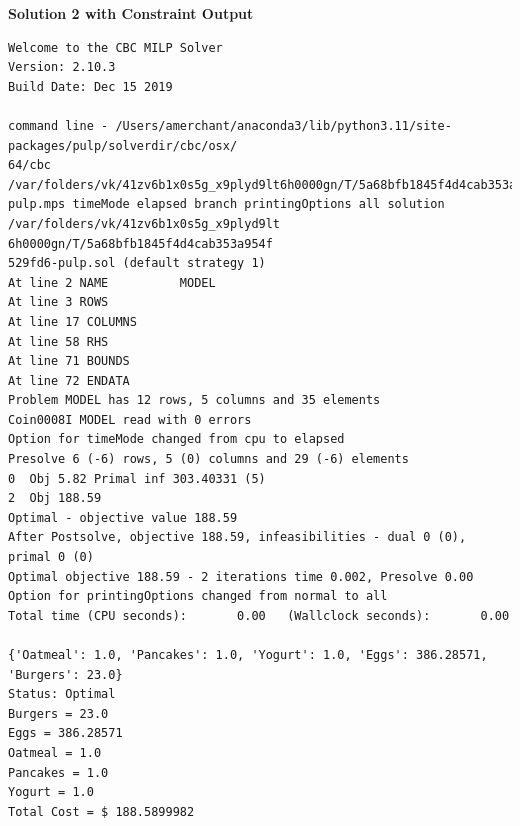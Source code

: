 \documentclass{article}
\begin{document}
\textbf{Solution 2 with Constraint Output}
\label{Solution2 Output}
\begin{lstlisting}[basicstyle=\small]
Welcome to the CBC MILP Solver 
Version: 2.10.3 
Build Date: Dec 15 2019 

command line - /Users/amerchant/anaconda3/lib/python3.11/site-packages/pulp/solverdir/cbc/osx/
64/cbc /var/folders/vk/41zv6b1x0s5g_x9plyd9lt6h0000gn/T/5a68bfb1845f4d4cab353a954f529fd6-
pulp.mps timeMode elapsed branch printingOptions all solution /var/folders/vk/41zv6b1x0s5g_x9plyd9lt
6h0000gn/T/5a68bfb1845f4d4cab353a954f
529fd6-pulp.sol (default strategy 1)
At line 2 NAME          MODEL
At line 3 ROWS
At line 17 COLUMNS
At line 58 RHS
At line 71 BOUNDS
At line 72 ENDATA
Problem MODEL has 12 rows, 5 columns and 35 elements
Coin0008I MODEL read with 0 errors
Option for timeMode changed from cpu to elapsed
Presolve 6 (-6) rows, 5 (0) columns and 29 (-6) elements
0  Obj 5.82 Primal inf 303.40331 (5)
2  Obj 188.59
Optimal - objective value 188.59
After Postsolve, objective 188.59, infeasibilities - dual 0 (0), primal 0 (0)
Optimal objective 188.59 - 2 iterations time 0.002, Presolve 0.00
Option for printingOptions changed from normal to all
Total time (CPU seconds):       0.00   (Wallclock seconds):       0.00

{'Oatmeal': 1.0, 'Pancakes': 1.0, 'Yogurt': 1.0, 'Eggs': 386.28571, 'Burgers': 23.0}
Status: Optimal
Burgers = 23.0
Eggs = 386.28571
Oatmeal = 1.0
Pancakes = 1.0
Yogurt = 1.0
Total Cost = $ 188.5899982
\end{lstlisting}
\end{document}
